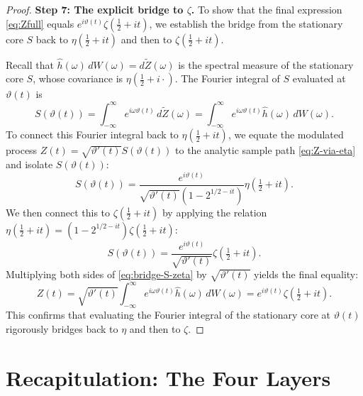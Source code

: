 \documentclass[11pt,a4paper]{article}
\begin{document}
\begin{proof}
\medskip\noindent\textbf{Step 7: The explicit bridge to $\zeta$.}
To show that the final expression \eqref{eq:Zfull} equals $e^{i\vartheta(t)}\zeta(\tfrac{1}{2}+it)$, we establish the bridge from the stationary core $S$ back to $\eta(\tfrac{1}{2}+it)$ and then to $\zeta(\tfrac{1}{2}+it)$.

Recall that $\hat{h}(\omega)\,dW(\omega) = d\widetilde{Z}(\omega)$ is the spectral measure of the stationary core $S$, whose covariance is $\eta(\tfrac{1}{2}+i\cdot)$. The Fourier integral of $S$ evaluated at $\vartheta(t)$ is
\begin{equation}
  S(\vartheta(t)) = \int_{-\infty}^{\infty} e^{i\omega\vartheta(t)}\,d\widetilde{Z}(\omega) = \int_{-\infty}^{\infty} e^{i\omega\vartheta(t)}\hat{h}(\omega)\,dW(\omega).
\end{equation}
To connect this Fourier integral back to $\eta(\tfrac{1}{2}+it)$, we equate the modulated process $Z(t) = \sqrt{\vartheta'(t)}S(\vartheta(t))$ to the analytic sample path \eqref{eq:Z-via-eta} and isolate $S(\vartheta(t))$:
\begin{equation}
  \label{eq:bridge-S-eta}
  S(\vartheta(t)) = \frac{e^{i\vartheta(t)}}{\sqrt{\vartheta'(t)}\left(1-2^{1/2-it}\right)} \eta\!\left(\tfrac{1}{2}+it\right).
\end{equation}
We then connect this to $\zeta(\tfrac{1}{2}+it)$ by applying the relation $\eta(\tfrac{1}{2}+it) = \left(1-2^{1/2-it}\right)\zeta(\tfrac{1}{2}+it)$:
\begin{equation}
  \label{eq:bridge-S-zeta}
  S(\vartheta(t)) = \frac{e^{i\vartheta(t)}}{\sqrt{\vartheta'(t)}} \zeta\!\left(\tfrac{1}{2}+it\right).
\end{equation}
Multiplying both sides of \eqref{eq:bridge-S-zeta} by $\sqrt{\vartheta'(t)}$ yields the final equality:
\begin{equation}
  \label{eq:bridge-full}
  Z(t) = \sqrt{\vartheta'(t)}\int_{-\infty}^{\infty} e^{i\omega\vartheta(t)}\hat{h}(\omega)\,dW(\omega) = e^{i\vartheta(t)}\zeta\!\left(\tfrac{1}{2}+it\right).
\end{equation}
This confirms that evaluating the Fourier integral of the stationary core at $\vartheta(t)$ rigorously bridges back to $\eta$ and then to $\zeta$.
\end{proof}

\section{Recapitulation: The Four Layers}
\end{document}

